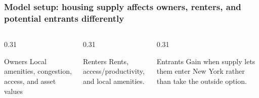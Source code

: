 
\begin{frame}[t]
    \frametitle{Model setup: housing supply affects owners, renters, and potential entrants differently}
    \small

    \begin{columns}[T,totalwidth=\textwidth]
        \begin{column}{0.31\textwidth}
            \begin{block}{Owners}
                \footnotesize
                Local amenities, congestion, access, and asset values \cite{ahlfeldt_economics_2015,redding_quantitative_2017}
            \end{block}
        \end{column}
        \begin{column}{0.31\textwidth}
            \begin{block}{Renters}
                \footnotesize
                Rents, access/productivity, and local amenities.
            \end{block}
        \end{column}
        \begin{column}{0.31\textwidth}
            \begin{block}{Entrants}
                \footnotesize
                Gain when supply lets them enter New York rather than take the outside option.
            \end{block}
        \end{column}
    \end{columns}


\end{frame}
